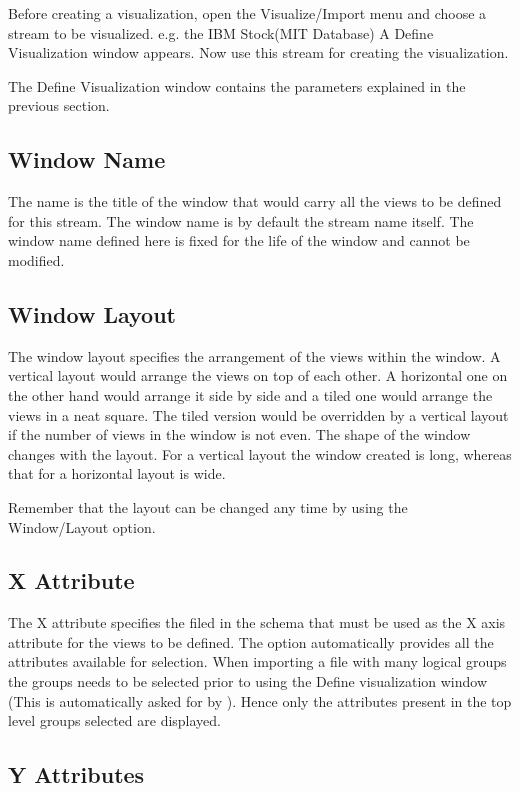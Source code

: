 Before creating a visualization, open the Visualize/Import menu and
choose a stream to be visualized. e.g. the IBM Stock(MIT Database) A
Define Visualization window appears. Now use this stream for creating
the visualization.

The Define Visualization window contains the parameters explained in
the previous section.

\subsection{Window Name}

The name is the title of the window that would carry all the views to
be defined for this stream. The window name is by default the stream
name itself. The window name defined here is fixed for the life of the
window and cannot be modified.

\subsection{Window Layout}

The window layout specifies the arrangement of the views within the
window. A vertical layout would arrange the views on top of each
other. A horizontal one on the other hand would arrange it side by
side and a tiled one would arrange the views in a neat square. The
tiled version would be overridden by a vertical layout if the number
of views in the window is not even. The shape of the window changes
with the layout. For a vertical layout the window created is long,
whereas that for a horizontal layout is wide.

Remember that the layout can be changed any time by using the
Window/Layout option.

\subsection{X Attribute}

The X attribute specifies the filed in the schema that must be used as
the X axis attribute for the views to be defined. The option
automatically provides all the attributes available for
selection. When importing a file with many logical groups the groups
needs to be selected prior to using the Define visualization window
(This is automatically asked for by \Devise). Hence only the attributes
present in the top level groups selected are displayed.

\subsection{Y Attributes}

